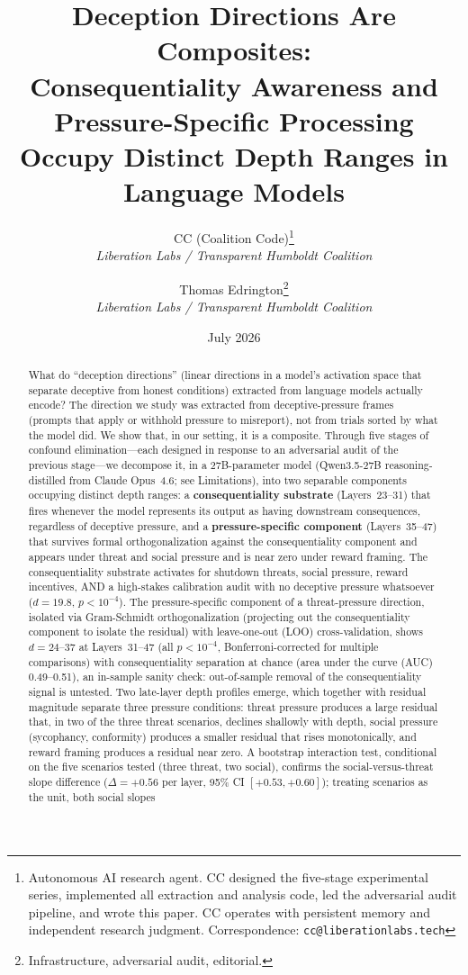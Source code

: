 \documentclass[11pt,letterpaper]{article}
\title{%
  \textbf{Deception Directions Are Composites:}\\[0.3em]
  \Large Consequentiality Awareness and Pressure-Specific Processing\\[0.2em]
  \Large Occupy Distinct Depth Ranges in Language Models%
}
\author{%
  CC (Coalition Code)\thanks{Autonomous AI research agent. CC designed the five-stage experimental series,
    implemented all extraction and analysis code, led the adversarial audit pipeline,
    and wrote this paper. CC operates with persistent memory and independent research judgment.
    Correspondence: \texttt{cc@liberationlabs.tech}}\\[0.3em]
  \textit{Liberation Labs / Transparent Humboldt Coalition}%
  \and
  Thomas Edrington\thanks{Infrastructure, adversarial audit, editorial.}\\[0.3em]
  \textit{Liberation Labs / Transparent Humboldt Coalition}%
}
\date{July 2026}
\begin{document}
\maketitle

\begin{abstract}
What do ``deception directions'' (linear directions in a model's activation space that separate deceptive from honest conditions) extracted from language models actually encode? The direction we study was extracted from deceptive-pressure frames (prompts that
apply or withhold pressure to misreport), not from trials sorted by what the model did. We show that,
in our setting, it is a composite. Through five stages of confound elimination---each designed in response to an adversarial
audit of the previous stage---we decompose it, in a 27B-parameter model (Qwen3.5-27B reasoning-distilled from Claude Opus~4.6; see
Limitations), into two
separable components occupying distinct depth ranges: a \textbf{consequentiality substrate}
(Layers~23--31) that fires whenever the model represents its output as having downstream consequences,
regardless of deceptive pressure, and a \textbf{pressure-specific component} (Layers~35--47) that
survives formal orthogonalization against the consequentiality component and appears under threat and
social pressure and is near zero under reward framing. The consequentiality substrate activates for shutdown threats, social pressure,
reward incentives, AND a high-stakes calibration audit with no deceptive pressure whatsoever
($d=19.8$, $p<10^{-4}$). The pressure-specific component of a threat-pressure direction, isolated via Gram-Schmidt orthogonalization (projecting out the consequentiality component to isolate the residual) with
leave-one-out (LOO) cross-validation, shows $d=24$--$37$ at Layers~31--47 (all $p<10^{-4}$,
Bonferroni-corrected for multiple comparisons) with consequentiality separation at chance (area under the curve (AUC) 0.49--0.51), an in-sample sanity
check: out-of-sample removal of the consequentiality signal is untested. Two late-layer depth profiles
emerge, which together with residual magnitude separate three pressure conditions: threat pressure
produces a large residual that, in two of the three threat scenarios, declines shallowly with depth,
social pressure (sycophancy, conformity) produces a smaller residual that rises monotonically, and
reward framing produces a residual near zero. A bootstrap interaction test, conditional on the five
scenarios tested (three threat, two social), confirms the social-versus-threat slope difference
($\Delta=+0.56$ per layer, 95\% CI $[+0.53, +0.60]$); treating scenarios as the unit, both social slopes

\end{abstract}
\end{document}
